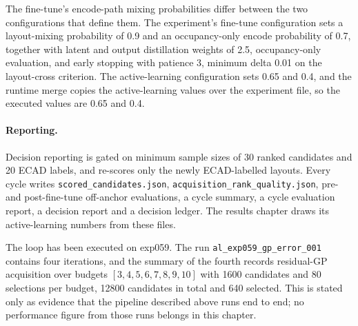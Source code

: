 The fine-tune's encode-path mixing probabilities differ between the two configurations that define
them. The experiment's fine-tune configuration sets a layout-mixing probability of 0.9 and an
occupancy-only encode probability of 0.7, together with latent and output distillation weights of
2.5, occupancy-only evaluation, and early stopping with patience 3, minimum delta 0.01 on the
layout-cross criterion. The active-learning configuration sets 0.65 and 0.4, and the runtime merge
copies the active-learning values over the experiment file, so the executed values are 0.65 and 0.4.

\paragraph{Reporting.} Decision reporting is gated on minimum sample sizes of 30 ranked candidates
and 20 ECAD labels, and re-scores only the newly ECAD-labelled layouts. Every cycle writes
\texttt{scored\_candidates.json}, \texttt{acquisition\_rank\_quality.json}, pre- and post-fine-tune
off-anchor evaluations, a cycle summary, a cycle evaluation report, a decision report and a decision
ledger. The results chapter draws its active-learning numbers from these files.

The loop has been executed on exp059. The run \texttt{al\_exp059\_gp\_error\_001} contains four
iterations, and the summary of the fourth records residual-GP acquisition over budgets
$[3,4,5,6,7,8,9,10]$ with 1600 candidates and 80 selections per budget, 12800 candidates in total and
640 selected. This is stated only as evidence that the pipeline described above runs end to end; no
performance figure from those runs belongs in this chapter.


